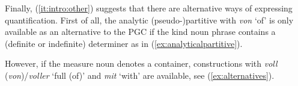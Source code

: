 \documentclass[USenglish]{article}
\begin{document}
Finally, (\ref{it:intro:other}) suggests that there are alternative ways of expressing quantification.
First of all, the analytic (pseudo-)partitive with \textit{von} `of' is only available as an alternative to the PGC if the kind noun phrase contains a (definite or indefinite) determiner as in (\ref{ex:analyticalpartitive}).

\begin{exe}
  \ex\label{ex:analyticalpartitive} 
  \begin{xlist}
  \end{xlist}
\end{exe}

However, if the measure noun denotes a container, constructions with \textit{voll} (\textit{von})\slash\textit{voller} `full (of)' and \textit{mit} `with' are available, see (\ref{ex:alternatives}).

\begin{exe}
  \ex\label{ex:alternatives}
  \begin{xlist}
  \end{xlist}
\end{exe}
\end{document}
